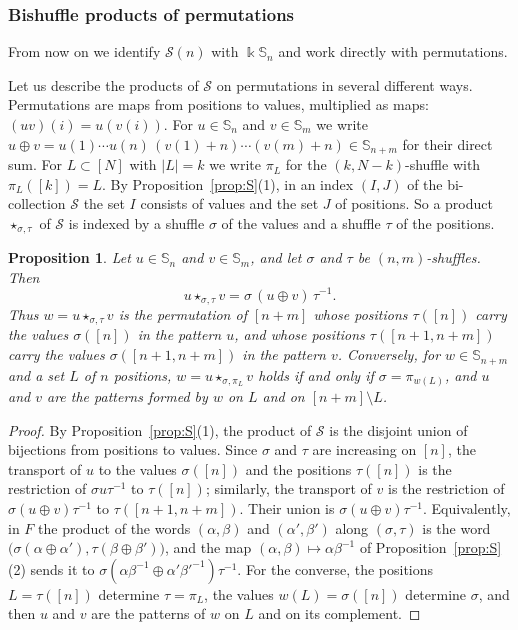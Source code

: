 \documentclass[11pt]{amsart}
\newtheorem{proposition}[theorem]{Proposition}
\theoremstyle{definition}
\theoremstyle{remark}
\newcommand{\bS}{\mathbb{S}}
\newcommand{\kk}{\Bbbk}
\newcommand{\cS}{\mathscr{S}}
\begin{document}
\subsubsection{Bishuffle products of permutations}
From now on we identify $\cS(n)$ with $\kk\bS_n$ and work directly with permutations.

Let us describe the products of $\cS$ on permutations in several different ways. Permutations are maps from positions to values, multiplied as maps: $(uv)(i)=u(v(i))$. For $u\in\bS_n$ and $v\in\bS_m$ we write $u\oplus v=u(1)\cdots u(n)\,(v(1)+n)\cdots(v(m)+n)\in\bS_{n+m}$ for their direct sum. For $L\subset[N]$ with $|L|=k$ we write $\pi_L$ for the $(k,N-k)$-shuffle with $\pi_L([k])=L$. By Proposition~\ref{prop:S}(1), in an index $(I,J)$ of the bi-collection $\cS$ the set $I$ consists of values and the set $J$ of positions. So a product $\star_{\sigma,\tau}$ of $\cS$ is indexed by a shuffle $\sigma$ of the values and a shuffle $\tau$ of the positions.

\begin{proposition}\label{prop:products}
Let $u\in\bS_n$ and $v\in\bS_m$, and let $\sigma$ and $\tau$ be $(n,m)$-shuffles. Then
\[
u\star_{\sigma,\tau}v=\sigma\,(u\oplus v)\,\tau^{-1}.
\]
Thus $w=u\star_{\sigma,\tau}v$ is the permutation of $[n+m]$ whose positions $\tau([n])$ carry the values $\sigma([n])$ in the pattern $u$, and whose positions $\tau([n+1,n+m])$ carry the values $\sigma([n+1,n+m])$ in the pattern $v$. Conversely, for $w\in\bS_{n+m}$ and a set $L$ of $n$ positions, $w=u\star_{\sigma,\pi_L}v$ holds if and only if $\sigma=\pi_{w(L)}$, and $u$ and $v$ are the patterns formed by $w$ on $L$ and on $[n+m]\setminus L$.
\end{proposition}

\begin{proof}
By Proposition~\ref{prop:S}(1), the product of $\cS$ is the disjoint union of bijections from positions to values. Since $\sigma$ and $\tau$ are increasing on $[n]$, the transport of $u$ to the values $\sigma([n])$ and the positions $\tau([n])$ is the restriction of $\sigma u\tau^{-1}$ to $\tau([n])$; similarly, the transport of $v$ is the restriction of $\sigma(u\oplus v)\tau^{-1}$ to $\tau([n+1,n+m])$. Their union is $\sigma(u\oplus v)\tau^{-1}$. Equivalently, in $F$ the product of the words $(\alpha,\beta)$ and $(\alpha',\beta')$ along $(\sigma,\tau)$ is the word $\bigl(\sigma(\alpha\oplus\alpha'),\tau(\beta\oplus\beta')\bigr)$, and the map $(\alpha,\beta)\mapsto\alpha\beta^{-1}$ of Proposition~\ref{prop:S}(2) sends it to $\sigma(\alpha\beta^{-1}\oplus\alpha'\beta'^{-1})\tau^{-1}$. For the converse, the positions $L=\tau([n])$ determine $\tau=\pi_L$, the values $w(L)=\sigma([n])$ determine $\sigma$, and then $u$ and $v$ are the patterns of $w$ on $L$ and on its complement.
\end{proof}
\end{document}
